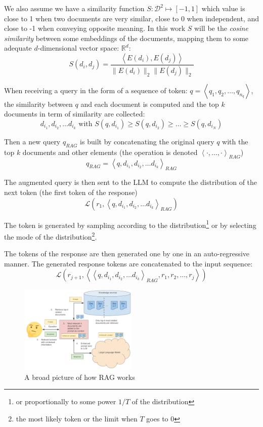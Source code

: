 \documentclass[conference]{IEEEtran}
\begin{document}
We also assume we have a similarity function
\(S: \mathcal{D}^2 \mapsto [-1, 1]\) which value is close to 1 when two
documents are very similar, close to 0 when independent, and close to -1
when conveying opposite meaning. In this work \(S\) will be the
\emph{cosine similarity} between some embeddings of the documents,
mapping them to some adequate \(d\)-dimensional vector space:
\(\mathbb{R}^d\):
\[S(d_i, d_j) = \frac{\left<E(d_i), E(d_j)\right>}{\|E(d_i)\|_2\|E(d_j)\|_2}\]

When receiving a query in the form of a sequence of token:
\(q = \left<q_1, q_2, \ldots, q_{n_q}\right>\), the similarity between
\(q\) and each document is computed and the top \(k\) documents in term
of similarity are collected:
\[d_{i_1}, d_{i_2}, \ldots d_{i_k} \text{ with } S(q, d_{i_1}) \geq S(q, d_{i_2}) \geq \ldots \geq S(q, d_{i_N})\]

Then a new query \(q_{RAG}\) is built by concatenating the original
query \(q\) with the top \(k\) documents and other elements (the
operation is denoted \(\left<\cdot, \ldots ,\cdot\right>_{RAG}\))
\[q_{RAG} = \left<q, d_{i_1}, d_{i_2}, \ldots d_{i_k}\right>_{RAG}\]

The augmented query is then sent to the LLM to compute the distribution
of the next token (the first token of the response)
\[\mathcal{L}\left(r_1, \left<q, d_{i_1}, d_{i_2}, \ldots d_{i_k}\right>_{RAG}\right)\]

The token is generated by sampling according to the
distribution\footnote{or proportionally to some power \(1/T\) of the
  distribution} or by selecting the mode of the distribution\footnote{the
  most likely token or the limit when \(T\) goes to \(0\)}.

The tokens of the response are then generated one by one in an
auto-regressive manner. The generated response tokens are concatenated
to the input sequence:
\[\mathcal{L}\left(r_{j+1}, \left<\left<q, d_{i_1}, d_{i_2}, \ldots d_{i_k}\right>_{RAG}, r_1, r_2,\ldots, r_j\right>\right)\]

\begin{figure}
\centering
\includegraphics[width=0.5\textwidth]{figures/noDP-RAG.pdf}
\caption{A broad picture of how RAG works}
\label{fig:rag}
\end{figure}
\end{document}
